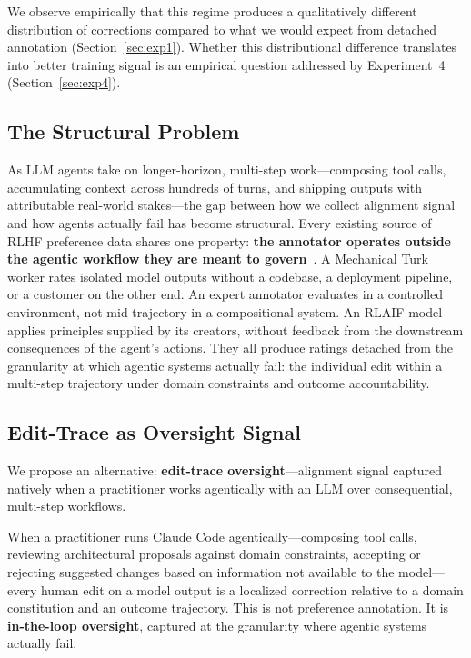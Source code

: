 \documentclass[11pt]{article}
\begin{document}
We observe empirically that this regime produces a qualitatively different distribution of corrections compared to what we would expect from detached annotation (Section~\ref{sec:exp1}).
Whether this distributional difference translates into better training signal is an empirical question addressed by Experiment~4 (Section~\ref{sec:exp4}).

\subsection{The Structural Problem}
\label{sec:structural-problem}

As LLM agents take on longer-horizon, multi-step work---composing tool calls, accumulating context across hundreds of turns, and shipping outputs with attributable real-world stakes---the gap between how we collect alignment signal and how agents actually fail has become structural.
Every existing source of RLHF preference data shares one property: \textbf{the annotator operates outside the agentic workflow they are meant to govern}~\citep{stiennon2020learning, ouyang2022training, bai2022training}.
A Mechanical Turk worker rates isolated model outputs without a codebase, a deployment pipeline, or a customer on the other end.
An expert annotator evaluates in a controlled environment, not mid-trajectory in a compositional system.
An RLAIF model~\citep{lee2023rlaif} applies principles supplied by its creators, without feedback from the downstream consequences of the agent's actions.
They all produce ratings detached from the granularity at which agentic systems actually fail: the individual edit within a multi-step trajectory under domain constraints and outcome accountability.

\subsection{Edit-Trace as Oversight Signal}
\label{sec:edit-trace-signal}

We propose an alternative: \textbf{edit-trace oversight}---alignment signal captured natively when a practitioner works agentically with an LLM over consequential, multi-step workflows.

When a practitioner runs Claude Code agentically---composing tool calls, reviewing architectural proposals against domain constraints, accepting or rejecting suggested changes based on information not available to the model---every human edit on a model output is a localized correction relative to a domain constitution and an outcome trajectory.
This is not preference annotation.
It is \textbf{in-the-loop oversight}, captured at the granularity where agentic systems actually fail.
\end{document}

